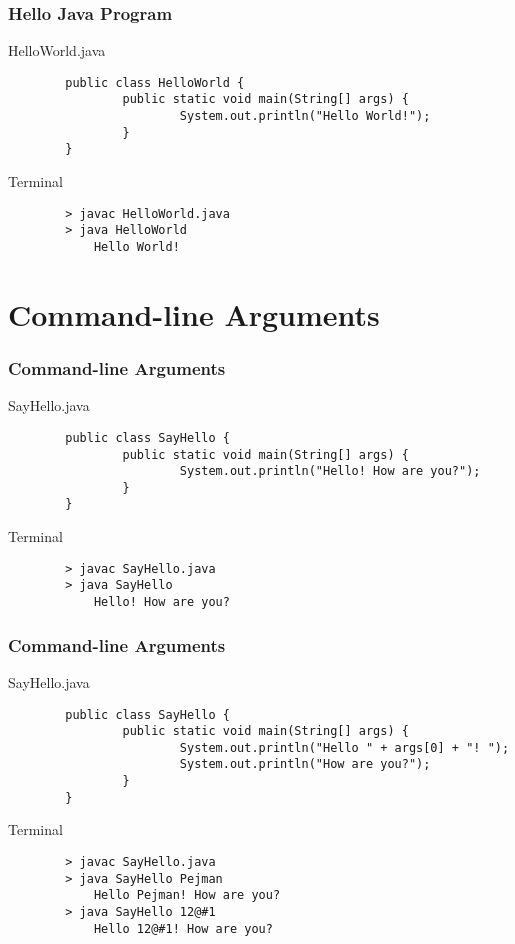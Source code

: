\documentclass[10pt, compress]{beamer}
\begin{document}
\begin{frame}[fragile]
	\frametitle{Hello Java Program}
	\begin{block}{HelloWorld.java}
		\begin{verbatim}
		public class HelloWorld {
				public static void main(String[] args) {
						System.out.println("Hello World!");
				}
		}
		\end{verbatim}
	\end{block}
	\begin{block}{Terminal}
		\begin{verbatim}
		> javac HelloWorld.java
		> java HelloWorld
			Hello World!
		\end{verbatim}
	\end{block}
\end{frame}

\section{Command-line Arguments}

\begin{frame}[fragile]
	\frametitle{Command-line Arguments}
	\begin{block}{SayHello.java}
		\begin{verbatim}
		public class SayHello {
				public static void main(String[] args) {
						System.out.println("Hello! How are you?");
				}
		}
		\end{verbatim}
	\end{block}
	\begin{block}{Terminal}
		\begin{verbatim}
		> javac SayHello.java
		> java SayHello
			Hello! How are you?
		\end{verbatim}
	\end{block}
\end{frame}

\begin{frame}[fragile]
	\frametitle{Command-line Arguments}
	\begin{block}{SayHello.java}
		\begin{verbatim}
		public class SayHello {
				public static void main(String[] args) {
						System.out.println("Hello " + args[0] + "! ");
						System.out.println("How are you?");
				}
		}
		\end{verbatim}
	\end{block}
	\begin{block}{Terminal}
		\begin{verbatim}
		> javac SayHello.java
		> java SayHello Pejman
			Hello Pejman! How are you?
		> java SayHello 12@#1
			Hello 12@#1! How are you?
		\end{verbatim}
	\end{block}
\end{frame}
\end{document}
